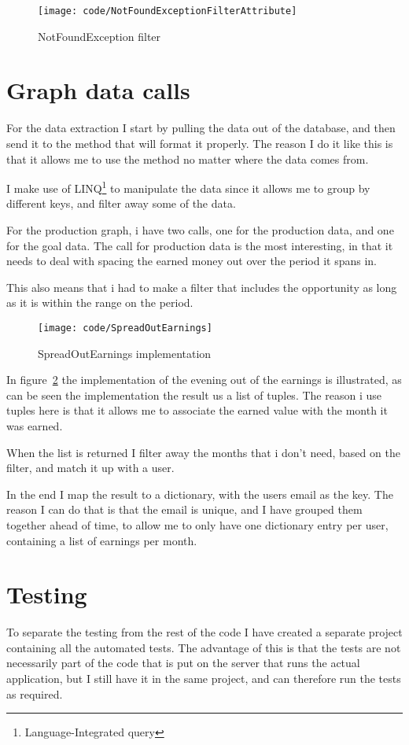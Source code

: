 \begin{figure}
  \texttt{[image: code/NotFoundExceptionFilterAttribute]}
  \caption{NotFoundException filter}
\label{fig:notfoundfilter}
\end{figure}

\section{Graph data calls}
\label{sec:Graph data calls}
For the data extraction I start by pulling the data out of the database, and
then send it to the method that will format it properly. The reason I do it like
this is that it allows me to use the method no matter where the data comes from. 

I make use of LINQ\footnote{Language-Integrated query} to manipulate the data
since it allows me to group by different keys, and filter away some of the data.

For the production graph, i have two calls, one for the production data, and one
for the goal data. The call for production data is the most interesting, in that
it needs to deal with spacing the earned money out over the period it spans in.

This also means that i had to make a filter that includes the opportunity as
long as it is within the range on the period.

\begin{figure}
  \texttt{[image: code/SpreadOutEarnings]}
  \caption{SpreadOutEarnings implementation}
\label{fig:spreadoutearnings}
\end{figure}

In figure~\ref{fig:spreadoutearnings} the implementation of the evening out of
the earnings is illustrated, as can be seen the implementation the result us a
list of tuples. The reason i use tuples here is that it allows me to associate
the earned value with the month it was earned.

When the list is returned I filter away the months that i don't need, based on
the filter, and match it up with a user.

In the end I map the result to a dictionary, with the users email as the key.
The reason I can do that is that the email is unique, and I have grouped them
together ahead of time, to allow me to only have one dictionary entry per user,
containing a list of earnings per month.

\section{Testing}
To separate the testing from the rest of the code I have created a separate
project containing all the automated tests. The advantage of this is that the
tests are not necessarily part of the code that is put on the server that runs
the actual application, but I still have it in the same project, and can
therefore run the tests as required.

